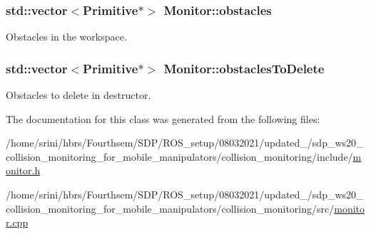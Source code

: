 \subsubsection[{\texorpdfstring{obstacles}{obstacles}}]{\setlength{\rightskip}{0pt plus 5cm}std\+::vector$<${\bf Primitive}$\ast$$>$ Monitor\+::obstacles}\hypertarget{class_monitor_a05fd42482269ad65432d5400c8f0f9b5}{}\label{class_monitor_a05fd42482269ad65432d5400c8f0f9b5}


Obstacles in the workspace. 

\subsubsection[{\texorpdfstring{obstacles\+To\+Delete}{obstaclesToDelete}}]{\setlength{\rightskip}{0pt plus 5cm}std\+::vector$<${\bf Primitive}$\ast$$>$ Monitor\+::obstacles\+To\+Delete}\hypertarget{class_monitor_a2207169c2b32b3bbf9925f3254064dee}{}\label{class_monitor_a2207169c2b32b3bbf9925f3254064dee}


Obstacles to delete in destructor. 



The documentation for this class was generated from the following files\+:\begin{DoxyCompactItemize}
\item 
/home/srini/hbrs/\+Fourthsem/\+S\+D\+P/\+R\+O\+S\+\_\+setup/08032021/updated\+\_/sdp\+\_\+ws20\+\_\+collision\+\_\+monitoring\+\_\+for\+\_\+mobile\+\_\+manipulators/collision\+\_\+monitoring/include/\hyperlink{monitor_8h}{monitor.\+h}\item 
/home/srini/hbrs/\+Fourthsem/\+S\+D\+P/\+R\+O\+S\+\_\+setup/08032021/updated\+\_/sdp\+\_\+ws20\+\_\+collision\+\_\+monitoring\+\_\+for\+\_\+mobile\+\_\+manipulators/collision\+\_\+monitoring/src/\hyperlink{monitor_8cpp}{monitor.\+cpp}\end{DoxyCompactItemize}
